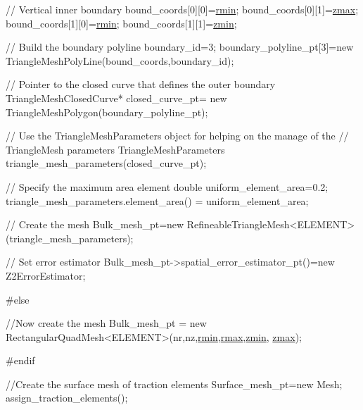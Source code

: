\begin{DoxyCodeInclude}
 \textcolor{comment}{// Vertical inner boundary}
 bound\_coords[0][0]=\hyperlink{namespaceGlobal__Parameters_ad454d80ae621f272dd1d7932249545a5}{rmin};
 bound\_coords[0][1]=\hyperlink{namespaceGlobal__Parameters_a8ee2afb91b9b105939f19a0efa8e1441}{zmax};
 bound\_coords[1][0]=\hyperlink{namespaceGlobal__Parameters_ad454d80ae621f272dd1d7932249545a5}{rmin};
 bound\_coords[1][1]=\hyperlink{namespaceGlobal__Parameters_ac6a17dbcf1b8f1136a1ec5c07efef708}{zmin};
 
 \textcolor{comment}{// Build the boundary polyline}
 boundary\_id=3;
 boundary\_polyline\_pt[3]=\textcolor{keyword}{new} TriangleMeshPolyLine(bound\_coords,boundary\_id);
 
 \textcolor{comment}{// Pointer to the closed curve that defines the outer boundary}
 TriangleMeshClosedCurve* closed\_curve\_pt= 
  \textcolor{keyword}{new} TriangleMeshPolygon(boundary\_polyline\_pt);
  
 \textcolor{comment}{// Use the TriangleMeshParameters object for helping on the manage of the}
 \textcolor{comment}{// TriangleMesh parameters}
 TriangleMeshParameters triangle\_mesh\_parameters(closed\_curve\_pt);

 \textcolor{comment}{// Specify the maximum area element}
 \textcolor{keywordtype}{double} uniform\_element\_area=0.2;
 triangle\_mesh\_parameters.element\_area() = uniform\_element\_area;

 \textcolor{comment}{// Create the mesh}
 Bulk\_mesh\_pt=\textcolor{keyword}{new} RefineableTriangleMesh<ELEMENT>(triangle\_mesh\_parameters);

 \textcolor{comment}{// Set error estimator}
 Bulk\_mesh\_pt->spatial\_error\_estimator\_pt()=\textcolor{keyword}{new} Z2ErrorEstimator;

\textcolor{preprocessor}{#else}

 \textcolor{comment}{//Now create the mesh}
 Bulk\_mesh\_pt = \textcolor{keyword}{new} RectangularQuadMesh<ELEMENT>(nr,nz,\hyperlink{namespaceGlobal__Parameters_ad454d80ae621f272dd1d7932249545a5}{rmin},\hyperlink{namespaceGlobal__Parameters_a5d7fb394c980bb4bf2a52158f9d7cc50}{rmax},\hyperlink{namespaceGlobal__Parameters_ac6a17dbcf1b8f1136a1ec5c07efef708}{zmin},
      \hyperlink{namespaceGlobal__Parameters_a8ee2afb91b9b105939f19a0efa8e1441}{zmax});

\textcolor{preprocessor}{#endif}

 \textcolor{comment}{//Create the surface mesh of traction elements}
 Surface\_mesh\_pt=\textcolor{keyword}{new} Mesh;
 assign\_traction\_elements();
 

\end{DoxyCodeInclude}
